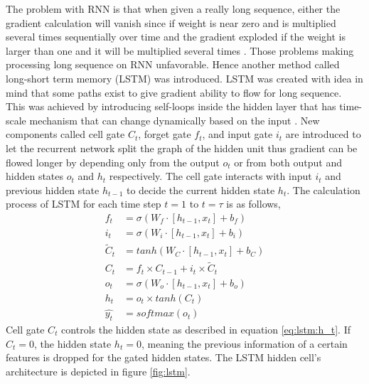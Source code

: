     The problem with RNN is that when given a really long sequence,
    either the gradient calculation will vanish since if weight is
    near zero and is multiplied several times sequentially over time
    and the gradient exploded if the weight is larger than one and it
    will be multiplied several times \citep{Goodfellow-et-al-2016}. Those
    problems making processing long sequence on RNN unfavorable. Hence
    another method called long-short term memory (LSTM) was
    introduced. LSTM was created with idea in mind that some paths
    exist to give gradient ability to flow for long sequence. This was
    achieved by introducing self-loops inside the hidden layer that
    has time-scale mechanism that can change dynamically based on the
    input \citep{Goodfellow-et-al-2016}. New components called cell
    gate $C_t$, forget gate $f_t$, and input gate $i_t$ are introduced
    to let the recurrent network split the graph of the hidden unit
    thus gradient can be flowed longer by depending only from the
    output $o_t$ or from both output and hidden states $o_t$ and $h_t$
    respectively. The cell gate interacts with input $i_t$ and previous
    hidden state $h_{t-1}$ to decide the current hidden state $h_t$.
    The calculation process of LSTM for each time step $t=1$ to
    $t=\tau$ is as follows,
    \begin{align}
        \label{eq:lstm:f_t}
        f_t &= \sigma(W_f \cdot [h_{t-1}, x_t] + b_f) \\
        \label{eq:lstm:i_t}    
        i_t &= \sigma(W_i \cdot [h_{t-1}, x_t] + b_i) \\
        \label{eq:lstm:Cc_t}
        \tilde{C}_t &= tanh(W_C \cdot [h_{t-1}, x_t] + b_C) \\
        \label{eq:lstm:C_t}
        C_t &= f_t \times C_{t-1} + i_t \times \tilde{C}_t \\
        \label{eq:lstm:o_t}
        o_t &= \sigma(W_o \cdot [h_{t-1}, x_t] + b_o) \\
        \label{eq:lstm:h_t}
        h_t &= o_t \times tanh(C_t) \\
        \label{eq:lstm:y_t}
        \hat{y_t} &= softmax(o_t)
    \end{align}
    Cell gate $C_t$ controls the hidden state as described in equation
    \ref{eq:lstm:h_t}. If $C_t = 0$, the hidden state $h_t = 0$,
    meaning the previous information of a certain features is dropped
    for the gated hidden states. The LSTM hidden cell's architecture
    is depicted in figure \ref{fig:lstm}.

